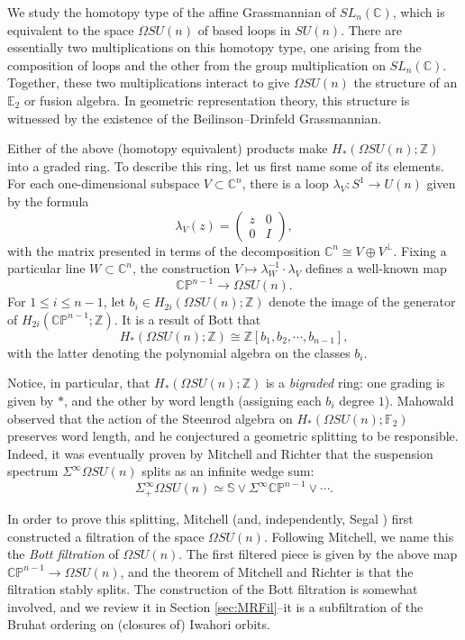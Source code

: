 We study the homotopy type of the affine Grassmannian of $SL_n(\mathbb{C})$, which is equivalent to the space $\Omega SU(n)$ of based loops in $SU(n)$.  There are essentially two multiplications on this homotopy type, one arising from the composition of loops and the other from the group multiplication on $SL_n(\mathbb{C})$.  Together, these two multiplications interact to give $\Omega SU(n)$ the structure of an $\mathbb{E}_2$ or fusion algebra.  In geometric representation theory, this structure is witnessed by the existence of the Beilinson--Drinfeld Grassmannian.

Either of the above (homotopy equivalent) products make $H_*(\Omega SU(n);\mathbb{Z})$ into a graded ring.  To describe this ring, let us first name some of its elements.  For each one-dimensional subspace $V \subset \mathbb{C}^n$, there is a loop $\lambda_V:S^1 \rightarrow U(n)$ given by the formula
$$\lambda_V(z)=\left( \begin{array}{cc} z & 0 \\ 0 & I \end{array} \right),$$
with the matrix presented in terms of the decomposition $\mathbb{C}^n \cong V \oplus V^{\perp}$.  Fixing a particular line $W \subset \mathbb{C}^n$, the construction $V \mapsto \lambda_W^{-1} \cdot \lambda_V$ defines a well-known map
$$\mathbb{CP}^{n-1} \rightarrow \Omega SU(n).$$
For $1 \le i \le n-1$, let $b_i \in H_{2i}(\Omega SU(n);\mathbb{Z})$ denote the image of the generator of $H_{2i}(\mathbb{CP}^{n-1};\mathbb{Z})$.  It is a result of Bott \cite{Bott} that
$$H_*(\Omega SU(n);\mathbb{Z}) \cong \mathbb{Z}[b_1,b_2,\cdots,b_{n-1}],$$
with the latter denoting the polynomial algebra on the classes $b_i$.

Notice, in particular, that $H_*(\Omega SU(n);\mathbb{Z})$ is a \textit{bigraded} ring: one grading is given by $*$, and the other by word length (assigning each $b_i$ degree $1$).  Mahowald observed that the action of the Steenrod algebra on $H_*(\Omega SU(n);\mathbb{F}_2)$ preserves word length, and he conjectured a geometric splitting to be responsible.  Indeed, it was eventually proven by Mitchell and Richter \cite[Theorem 2.1]{CrabbMitchell} that the suspension spectrum $\Sigma^{\infty} \Omega SU(n)$ splits as an infinite wedge sum:
$$\Sigma^{\infty}_+ \Omega SU(n) \simeq \mathbb{S} \vee \Sigma^{\infty} \mathbb{CP}^{n-1} \vee \cdots.$$

In order to prove this splitting, Mitchell \cite{MitchellSU(n)} (and, independently, Segal \cite{Segal}) first constructed a filtration of the space $\Omega SU(n)$.  Following Mitchell, we name this the \textit{Bott filtration} of $\Omega SU(n)$.  The first filtered piece is given by the above map $\mathbb{CP}^{n-1} \rightarrow \Omega SU(n)$, and the theorem of Mitchell and Richter is that the filtration stably splits.  The construction of the Bott filtration is somewhat involved, and we review it in Section \ref{sec:MRFil}--it is a subfiltration of the Bruhat ordering on (closures of) Iwahori orbits.

